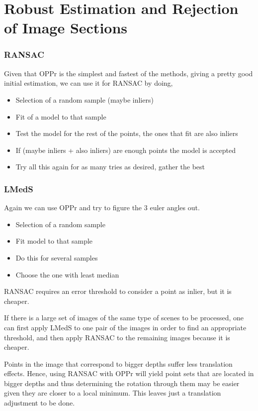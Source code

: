 
\section{Robust Estimation and Rejection of Image Sections}
\label{cha2:robustest}
\subsubsection{RANSAC}
Given that OPPr is the simplest and fastest of the methods, giving a pretty good initial estimation, we can use it for RANSAC by doing,

\begin{itemize}
	\item Selection of a random sample (maybe inliers)
	\item Fit of a model to that sample
	\item Test the model for the rest of the points, the ones that fit are also inliers
	\item If (maybe inliers + also inliers) are enough points the model is accepted
	\item Try all this again for as many tries as desired, gather the best
\end{itemize}

\subsubsection{LMedS}
Again we can use OPPr and try to figure the 3 euler angles out.

\begin{itemize}
	\item Selection of a random sample
	\item Fit model to that sample
	\item Do this for several samples
	\item Choose the one with least median
\end{itemize}

RANSAC requires an error threshold to consider a point as inlier, but it is cheaper.

If there is a large set of images of the same type of scenes to be processed, one can first apply LMedS to one pair of the images in order to find an appropriate threshold, and then apply RANSAC to the remaining images because it is cheaper.

Points in the image that correspond to bigger depths suffer less translation effects. Hence, using RANSAC with OPPr will yield point sets that are located in bigger depths and thus determining the rotation through them may be easier given they are closer to a local minimum. This leaves just a translation adjustment to be done.

